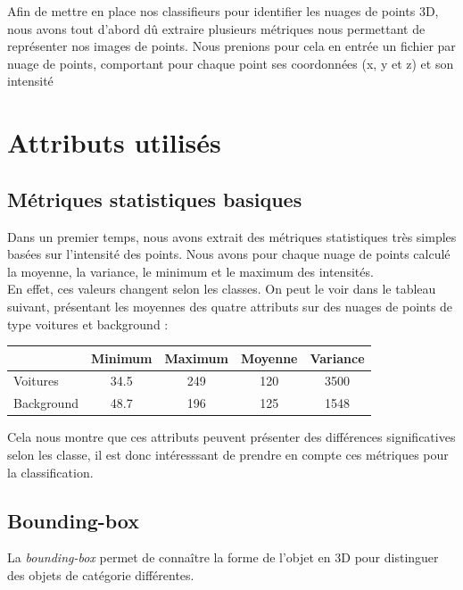 Afin de mettre en place nos classifieurs pour identifier les nuages de points 3D, nous avons tout d'abord dû extraire plusieurs métriques nous permettant de représenter nos images de points. Nous prenions pour cela en entrée un fichier par nuage de points, comportant pour chaque point ses coordonnées (x, y et z) et son intensité

\section{Attributs utilisés}
	\subsection{Métriques statistiques basiques}
		Dans un premier temps, nous avons extrait des métriques statistiques très simples basées sur l'intensité des points. Nous avons pour chaque nuage de points calculé la moyenne, la variance, le minimum et le maximum des intensités.\\

		En effet, ces valeurs changent selon les classes. On peut le voir dans le tableau suivant, présentant les moyennes des quatre attributs sur des nuages de points de type voitures et background :\\

		\begin{center}
			\begin{tabular}{|l||c|c|c|c|}
			  \hline
			  & Minimum & Maximum & Moyenne & Variance \\
			  \hline
			  Voitures & 34.5 & 249 & 120 & 3500 \\
			  Background & 48.7 & 196 & 125 & 1548 \\
			  \hline
			\end{tabular}
		\end{center}


		Cela nous montre que ces attributs peuvent présenter des différences significatives selon les classe, il est donc intéresssant de prendre en compte ces métriques pour la classification.

	\subsection{Bounding-box}
		La \emph{bounding-box} permet de connaître la forme de l'objet en 3D pour distinguer des objets de catégorie différentes.

